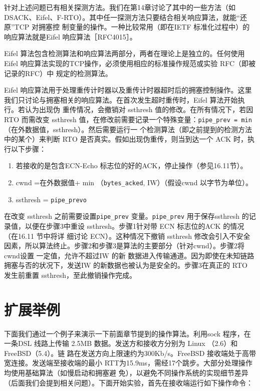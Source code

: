 针对上述问题已有相关探测方法。我们在第14章讨论了其中的一些方法（如DSACK、Eifel、F-RTO）。其中任一探测方法只要结合相关响应算法，就能“还原”TCP 对拥塞控
制变量的操作。一种比较常用（即在IETF 标准化过程中）的响应算法就是Eifel 响应算法［RFC4015］。

Eifel 算法包含检测算法和响应算法两部分，两者在理论上是独立的。任何使用 Eifel 响应算法实现的TCP操作，必须使用相应的标准操作规范或实验 RFC（即被记录的RFC）中
规定的检测算法。

Eifel 响应算法用于处理重传计时器以及重传计时器超时后的拥塞控制操作。这里我们只讨论与拥塞相关的响应算法。在首次发生超时重传时，Eifel 算法开始执行。若认为出现伪
重传情况，会撤销对 ssthresh 值的修改。在所有情况下，若因 RTO 而需改变 ssthresh 值，在修改前需要记录一个特殊变量：\verb|pipe_prev = min|（在外数据值，ssthresh）。然后需要运行一
个检测算法（即之前提到的检测方法中的某个）来判断 RTO 是否真实。假如出现伪重传，则当到达一个 ACK 时，执行以下步骤：

\begin{enumerate}
    \item 若接收的是包含ECN-Echo 标志位的好的ACK，停止操作（参见16.11节）。
    \item cwnd =在外数据值+ min （\verb|bytes_acked|, IW）（假设cwnd 以字节为单位）。
    \item ssthresh = \verb|pipe_prevo|
\end{enumerate}

在改变 ssthresh 之前需要设置\verb|pipe_prev| 变量。\verb|pipe_prev| 用于保存ssthresh 的记录值，以便在步骤3中重设 ssthresh。步骤1针对带 ECN 标志位的ACK 的情况（在16.11 节中将详
细讨论 ECN）。这种情况下撤销 ssthresh 修改会引入不安全因素，所以算法终止。步骤2和步骤3是算法的主要部分（针对cwnd）。步骤2将cwnd设置 一定值，允许不超过IW 的新
数据进入传输通道。因为即使在未知链路拥塞与否的状况下，发送IW 的新数据也被认为是安全的。步骤3在真正的 RTO 发生前重置 ssthresh，至此撤销操作完成。

\section{扩展举例}
下面我们通过一个例子来演示一下前面章节提到的操作算法。利用sock 程序，在一条DSL 线路上传输 2.5MB 数据。发送方和接收方分别为 Linux （2.6）和 FreeBSD（5.4）。链
路在发送方向上限速约为300Kb/s。FreeBSD 接收端处于高带宽连接。发送端至接收端的最小 RTT为15.9ms，需经17个跳步。大部分处理操作均使用基础算法（如慢启动和拥塞避
免），以避免不同操作系统的实现细节差异（后面我们会提到相关问题）。下面开始实验，首先在接收端运行如下操作命令：

